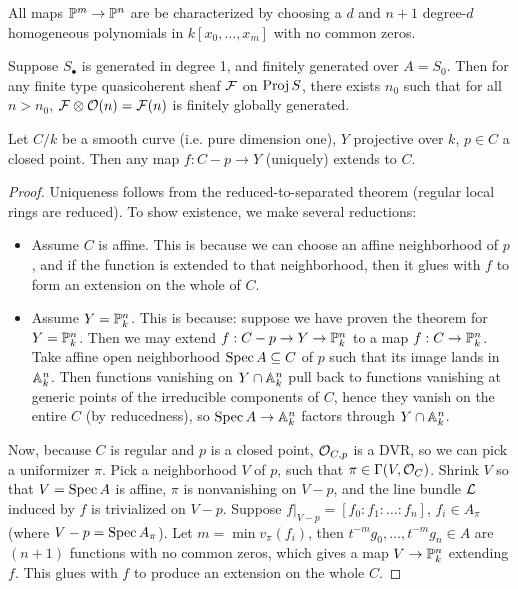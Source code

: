 \documentclass[11pt]{amsart}
\begin{document}
\begin{exm}
    All maps $\PP^m\to \PP^n$ are be characterized by choosing a $d$ and $n+1$ degree-$d$ homogeneous polynomials in $k[x_0,\dots,x_m]$ with no common zeros. 
\end{exm}

\begin{thm}
    Suppose $S_\bullet$ is generated in degree 1, and finitely generated over $A = S_0$. Then for any finite type quasicoherent sheaf $\cF$ on $\Proj S$, there exists $n_0$ such that for all $n>n_0$, $\cF\otimes \cO(n) = \cF(n)$ is finitely globally generated. 
\end{thm}

\begin{thm}
    Let $C/k$ be a smooth curve (i.e. pure dimension one), $Y$ projective over $k$, $p\in C$ a closed point. Then any map $f:C-p \to Y$ (uniquely) extends to $C$.
\end{thm}

\begin{proof}
    Uniqueness follows from the reduced-to-separated theorem (regular local rings are reduced). To show existence, we make several reductions:
    \begin{itemize}
        \item Assume $C$ is affine. This is because we can choose an affine neighborhood of $p$, and if the function is extended to that neighborhood, then it glues with $f$ to form an extension on the whole of $C$.
        
        \item Assume $Y = \PP^n_k$. This is because: suppose we have proven the theorem for $Y = \PP^n_k$. Then we may extend $f:C-p\to Y \to \PP^n_k$ to a map $f:C\to \PP^n_k$. Take affine open neighborhood $\Spec A\subseteq C$ of $p$ such that its image lands in $\AA_k^n$. Then functions vanishing on $Y\cap \AA_k^n$ pull back to functions vanishing at generic points of the irreducible components of $C$, hence they vanish on the entire $C$ (by reducedness), so $\Spec A\to \AA_k^n$ factors through $Y\cap \AA_k^n$.
    \end{itemize}

    Now, because $C$ is regular and $p$ is a closed point, $\cO_{C, p}$ is a DVR, so we can pick a uniformizer $\pi$. Pick a neighborhood $V$ of $p$, such that $\pi\in \Gamma(V, \cO_C)$. Shrink $V$ so that $V=\Spec A$ is affine, $\pi$ is nonvanishing on $V-p$, and the line bundle $\cL$ induced by $f$ is trivialized on $V-p$. Suppose $f|_{V-p} = [f_0:f_1:\dots:f_n]$, $f_i\in A_\pi$ (where $V-p = \Spec A_\pi$). Let $m = \min v_\pi(f_i)$, then $t^{-m}g_0, \dots, t^{-m}g_n \in A$ are $(n+1)$ functions with no common zeros, which gives a map $V\to \PP^n_k$ extending $f$. This glues with $f$ to produce an extension on the whole $C$. 
\end{proof}
\end{document}
